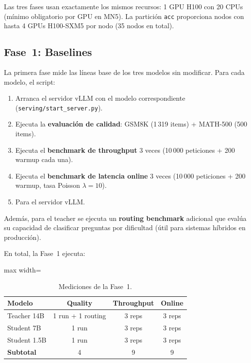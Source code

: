 \documentclass[11pt,a4paper]{article}
\begin{document}
Las tres fases usan exactamente los mismos recursos: 1 GPU H100 con
20 CPUs (m\'inimo obligatorio por GPU en MN5). La partici\'on
\texttt{acc} proporciona nodos con hasta 4 GPUs H100-SXM5 por nodo
(35 nodos en total).

\subsection{Fase~1: Baselines}

La primera fase mide las l\'ineas base de los tres modelos sin
modificar. Para cada modelo, el script:

\begin{enumerate}
  \item Arranca el servidor vLLM con el modelo correspondiente
    (\texttt{serving/start\_server.py}).
  \item Ejecuta la \textbf{evaluaci\'on de calidad}: GSM8K (1\,319
    items) + MATH-500 (500 items).
  \item Ejecuta el \textbf{benchmark de throughput} 3 veces (10\,000
    peticiones + 200 warmup cada una).
  \item Ejecuta el \textbf{benchmark de latencia online} 3 veces
    (10\,000 peticiones + 200 warmup, tasa Poisson $\lambda=10$).
  \item Para el servidor vLLM.
\end{enumerate}

Adem\'as, para el teacher se ejecuta un \textbf{routing benchmark}
adicional que eval\'ua su capacidad de clasificar preguntas por
dificultad (\'util para sistemas h\'ibridos en producci\'on).

En total, la Fase~1 ejecuta:

\begin{table}[H]
\centering
\caption{Mediciones de la Fase~1.}
\label{tab:fase1-runs}
\begin{adjustbox}{max width=\textwidth}
\begin{tabular}{@{}lccc@{}}
\toprule
\textbf{Modelo} & \textbf{Quality} & \textbf{Throughput} & \textbf{Online} \\
\midrule
Teacher 14B  & 1 run + 1 routing & 3 reps & 3 reps \\
Student 7B   & 1 run             & 3 reps & 3 reps \\
Student 1.5B & 1 run             & 3 reps & 3 reps \\
\midrule
\textbf{Subtotal} & 4 & 9 & 9 \\
\bottomrule
\end{tabular}
\end{adjustbox}
\end{table}
\end{document}
